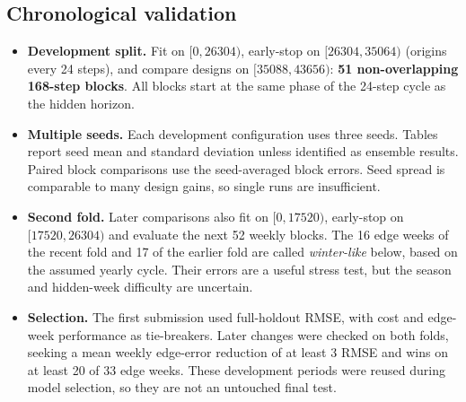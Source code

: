 \subsection{Chronological validation}
\begin{itemize}
  \item \textbf{Development split.} Fit on $[0,26304)$, early-stop on
        $[26304,35064)$ (origins every 24 steps), and compare designs on
        $[35088,43656)$: \textbf{51 non-overlapping 168-step blocks}.
        All blocks start at the same phase of the 24-step cycle as the hidden horizon.
  \item \textbf{Multiple seeds.} Each development configuration uses three seeds.
        Tables report seed mean and standard deviation unless identified as ensemble
        results. Paired block comparisons use the seed-averaged block errors.
        Seed spread is comparable to many design gains, so single runs are insufficient.
  \item \textbf{Second fold.} Later comparisons also fit on $[0,17520)$,
        early-stop on $[17520,26304)$ and evaluate the next 52 weekly blocks.
        The 16 edge weeks of the recent fold and 17 of the earlier fold are called
        \emph{winter-like} below, based on the assumed yearly cycle. Their errors are
        a useful stress test, but the season and hidden-week difficulty are uncertain.
  \item \textbf{Selection.} The first submission used full-holdout RMSE, with cost
        and edge-week performance as tie-breakers. Later changes were checked on both
        folds, seeking a mean weekly edge-error reduction of at least 3 RMSE and wins
        on at least 20 of 33 edge weeks. These development periods were reused during
        model selection, so they are not an untouched final test.
\end{itemize}

